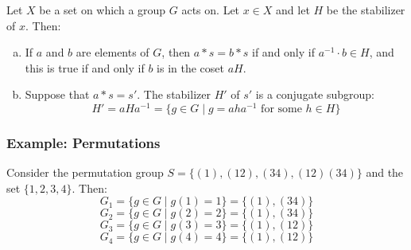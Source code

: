 \documentclass[letterpaper]{article}
\begin{document}
\begin{mdframed}
    \begin{proposition}
        Let $X$ be a set on which a group $G$ acts on. Let $x \in X$ and let $H$ be the stabilizer of $x$. Then: 
        \begin{enumerate}[(a)]
            \item If $a$ and $b$ are elements of $G$, then $a * s = b * s$ if and only if $a^{-1} \cdot b \in H$, and this is true if and only if $b$ is in the coset $aH$. 
            \item Suppose that $a * s = s'$. The stabilizer $H'$ of $s'$ is a conjugate subgroup: 
            \[H' = aHa^{-1} = \{g \in G \mid g = aha^{-1} \text{ for some } h \in H\}\]
        \end{enumerate}
    \end{proposition}
\end{mdframed}

\subsubsection{Example: Permutations}
Consider the permutation group $S = \{(1), (12), (34), (12)(34)\}$ and the set $\{1, 2, 3, 4\}$. Then: 
\[G_1 = \{g \in G \mid g(1) = 1\} = \{(1), (34)\}\]
\[G_2 = \{g \in G \mid g(2) = 2\} = \{(1), (34)\}\]
\[G_3 = \{g \in G \mid g(3) = 3\} = \{(1), (12)\}\]
\[G_4 = \{g \in G \mid g(4) = 4\} = \{(1), (12)\}\]
\end{document}
